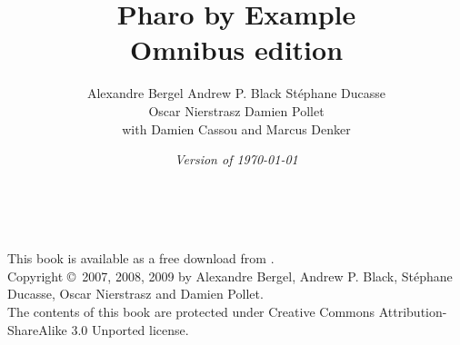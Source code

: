 \documentclass[a4paper,10pt,twoside]{book}
\begin{document}
\frontmatter
\setcounter{page}{1}
\pagestyle{headings}
\author{
	 Alexandre Bergel\quad
	Andrew P. Black\quad
	St\'ephane Ducasse\\[1ex]
	Oscar Nierstrasz\quad
	Damien Pollet
	\\[4ex]
	with Damien Cassou and Marcus Denker}
\title{\Huge\bf Pharo by Example\\ Omnibus edition}
\isodate
\date{\emph{Version of \today}}
\maketitle
~ %
\vfill
\begin{footnotesize}
\setlength{\parindent}{0pt}
This book is available as a free download from \pbe.\\[1cm]

Copyright \copyright~2007, 2008, 2009 by Alexandre Bergel, Andrew P. Black, St\'ephane Ducasse, Oscar Nierstrasz and Damien Pollet.\\[1cm]

The contents of this book are protected under Creative Commons Attribution-ShareAlike 3.0 Unported license.


\end{footnotesize}
\end{document}
